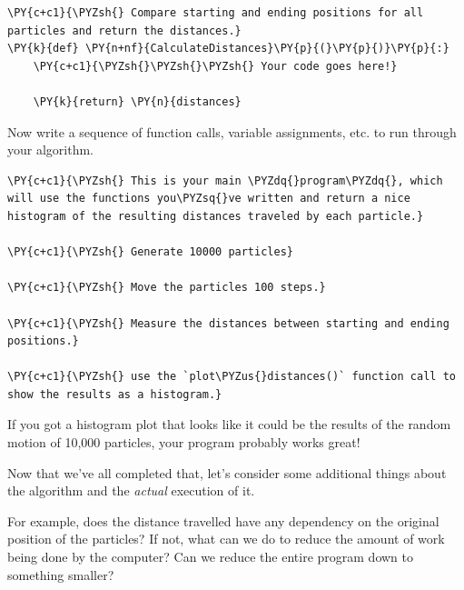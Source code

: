     \begin{tcolorbox}[breakable, size=fbox, boxrule=1pt, pad at break*=1mm,colback=cellbackground, colframe=cellborder]
\begin{Verbatim}[commandchars=\\\{\}]
\PY{c+c1}{\PYZsh{} Compare starting and ending positions for all particles and return the distances.}
\PY{k}{def} \PY{n+nf}{CalculateDistances}\PY{p}{(}\PY{p}{)}\PY{p}{:}
    \PY{c+c1}{\PYZsh{}\PYZsh{}\PYZsh{} Your code goes here!}

    \PY{k}{return} \PY{n}{distances}
\end{Verbatim}
\end{tcolorbox}

    Now write a sequence of function calls, variable assignments, etc. to
run through your algorithm.

    \begin{tcolorbox}[breakable, size=fbox, boxrule=1pt, pad at break*=1mm,colback=cellbackground, colframe=cellborder]
\begin{Verbatim}[commandchars=\\\{\}]
\PY{c+c1}{\PYZsh{} This is your main \PYZdq{}program\PYZdq{}, which will use the functions you\PYZsq{}ve written and return a nice histogram of the resulting distances traveled by each particle.}

\PY{c+c1}{\PYZsh{} Generate 10000 particles}

\PY{c+c1}{\PYZsh{} Move the particles 100 steps.}

\PY{c+c1}{\PYZsh{} Measure the distances between starting and ending positions.}

\PY{c+c1}{\PYZsh{} use the `plot\PYZus{}distances()` function call to show the results as a histogram.}
\end{Verbatim}
\end{tcolorbox}

    If you got a histogram plot that looks like it could be the results of
the random motion of 10,000 particles, your program probably works
great!

Now that we've all completed that, let's consider some additional things
about the algorithm and the \emph{actual} execution of it.

For example, does the distance travelled have any dependency on the
original position of the particles? If not, what can we do to reduce the
amount of work being done by the computer? Can we reduce the entire
program down to something smaller?

